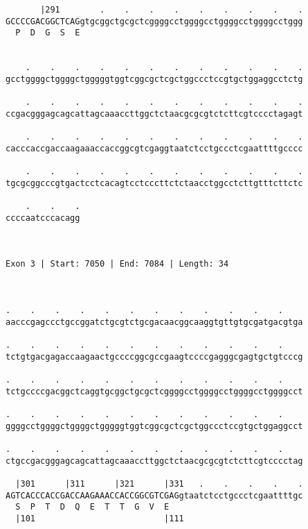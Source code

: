 \documentclass{article}
\begin{document}
\begin{Verbatim}
       |291        .    .    .    .    .    .    .    .    .
GCCCCGACGGCTCAGgtgcggctgcgctcggggcctggggcctggggcctggggcctggg
  P  D  G  S  E                                             
                                                            
  
    .    .    .    .    .    .    .    .    .    .    .    .
gcctggggctggggctgggggtggtcggcgctcgctggccctccgtgctggaggcctctg
                                                            
    .    .    .    .    .    .    .    .    .    .    .    .
ccgacgggagcagcattagcaaaccttggctctaacgcgcgtctcttcgtcccctagagt
                                                            
    .    .    .    .    .    .    .    .    .    .    .    .
cacccaccgaccaagaaaccaccggcgtcgaggtaatctcctgccctcgaattttgcccc
                                                            
    .    .    .    .    .    .    .    .    .    .    .    .
tgcgcggcccgtgactcctcacagtcctcccttctctaacctggcctcttgtttcttctc
                                                            
    .    .    .
ccccaatcccacagg
               
               
 
Exon 3 | Start: 7050 | End: 7084 | Length: 34



.    .    .    .    .    .    .    .    .    .    .    .    
aacccgagccctgccggatctgcgtctgcgacaacggcaaggtgttgtgcgatgacgtga
                                                            
.    .    .    .    .    .    .    .    .    .    .    .    
tctgtgacgagaccaagaactgccccggcgccgaagtccccgagggcgagtgctgtcccg
                                                            
.    .    .    .    .    .    .    .    .    .    .    .    
tctgccccgacggctcaggtgcggctgcgctcggggcctggggcctggggcctggggcct
                                                            
.    .    .    .    .    .    .    .    .    .    .    .    
ggggcctggggctggggctgggggtggtcggcgctcgctggccctccgtgctggaggcct
                                                            
.    .    .    .    .    .    .    .    .    .    .    .    
ctgccgacgggagcagcattagcaaaccttggctctaacgcgcgtctcttcgtcccctag
                                                            
  |301      |311      |321      |331   .    .    .    .    .
AGTCACCCACCGACCAAGAAACCACCGGCGTCGAGgtaatctcctgccctcgaattttgc
  S  P  T  D  Q  E  T  T  G  V  E                           
  |101                          |111                        
  

\end{Verbatim}
\end{document}
